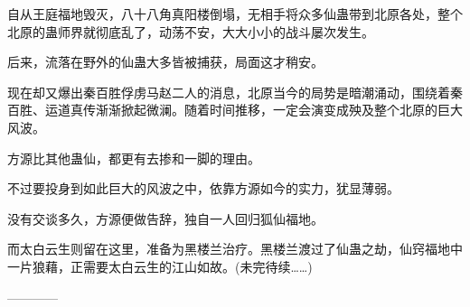 \begin{this_body}
自从王庭福地毁灭，八十八角真阳楼倒塌，无相手将众多仙蛊带到北原各处，整个北原的蛊师界就彻底乱了，动荡不安，大大小小的战斗屡次发生。

后来，流落在野外的仙蛊大多皆被捕获，局面这才稍安。

现在却又爆出秦百胜俘虏马赵二人的消息，北原当今的局势是暗潮涌动，围绕着秦百胜、运道真传渐渐掀起微澜。随着时间推移，一定会演变成殃及整个北原的巨大风波。

方源比其他蛊仙，都更有去掺和一脚的理由。

不过要投身到如此巨大的风波之中，依靠方源如今的实力，犹显薄弱。

没有交谈多久，方源便做告辞，独自一人回归狐仙福地。

而太白云生则留在这里，准备为黑楼兰治疗。黑楼兰渡过了仙蛊之劫，仙窍福地中一片狼藉，正需要太白云生的江山如故。(未完待续……)

------------

\end{this_body}

